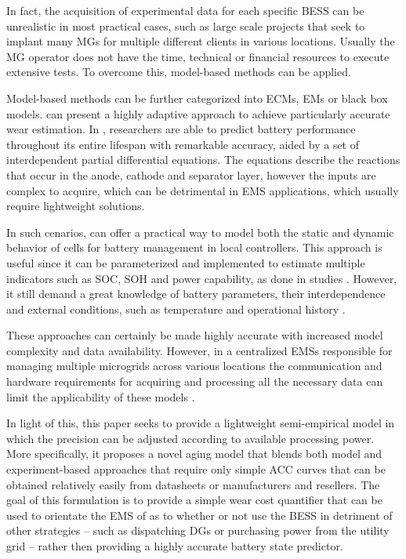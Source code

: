 \documentclass{ieeeaccess}
\begin{document}
    In fact, the acquisition of experimental data for each specific \ac{BESS} can be unrealistic in most practical cases, such as large scale projects that seek to implant many \acp{MG} for multiple different clients in various locations. Usually the \ac{MG} operator does not have the time, technical or financial resources to execute extensive tests. To overcome this, model-based methods can be applied.

    Model-based methods can be further categorized into \acp{ECM}, \acp{EM} or black box models.  can present a highly adaptive approach to achieve particularly accurate wear estimation. In \cite{XIONG2018264}, researchers are able to predict battery performance throughout its entire lifespan with remarkable accuracy, aided by a set of interdependent partial differential equations. The equations describe the reactions that occur in the anode, cathode and separator layer, however the inputs are complex to acquire, which can be detrimental in \ac{EMS} applications, which usually require lightweight solutions.

    In such cenarios,  can offer a practical way to model both the static and dynamic behavior of cells for battery management in local controllers. This approach is useful since it can be parameterized and implemented to estimate multiple indicators such as \ac{SOC}, \ac{SOH} and power capability, as done in studies \cite{verbrugge2004adaptive, verbrugge2007adaptive}. However, it still demand a great knowledge of battery parameters, their interdependence and external conditions, such as temperature and operational history \cite{zhang2018online}.

    These approaches can certainly be made highly accurate with increased model complexity and data availability. However, in a centralized \acp{EMS} responsible for managing multiple microgrids across various locations the communication and hardware requirements for acquiring and processing all the necessary data can limit the applicability of these models \cite{DIMEASHATZIARGYRIOU2005}.

    In light of this, this paper seeks to provide a lightweight semi-empirical model in which the precision can be adjusted according to available processing power. More specifically, it proposes a novel aging model that blends both model and experiment-based approaches that require only simple \ac{ACC} curves that can be obtained relatively easily from datasheets or manufacturers and resellers. The goal of this formulation is to provide a simple wear cost quantifier that can be used to orientate the \ac{EMS} of  as to whether or not use the \ac{BESS} in detriment of other strategies -- such as dispatching \ac{DG}s or purchasing power from the utility grid -- rather then providing a highly accurate battery state predictor.
\end{document}
